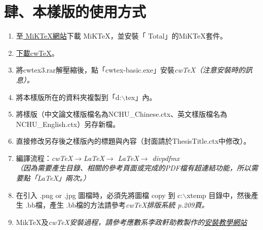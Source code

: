 \chapter{肆、本樣版的使用方式}
\begin{enumerate}
    \item 至\href{http://www.miktex.org/}{ MiKTeX網站}下載 MiK\TeX ，並安裝「 Total」的MiK\TeX 套件。
    \item \href{http://www.amath.nchu.edu.tw/~u4815977/cwtex3.rar}{下載cw\TeX}。
    \item 將cwtex3.rar解壓縮後，點「cwtex-basic.exe」安裝\it{cw}\TeX （注意安裝時的訊息）。
    \item 將本樣版所在的資料夾複製到「d:$\backslash$tex」內。
    \item 將樣版（中文論文樣版檔名為NCHU\_Chinese.ctx、英文樣版檔名為NCHU\_English.ctx）另存新檔。
    \item 直接修改另存後之樣版內的標題與內容（封面請於ThesisTitle.ctx中修改）。
    \item 編譯流程：\it{cw}\TeX $\rightarrow$\LaTeX $\rightarrow$ \LaTeX $\rightarrow$ divpdfmx\\
        （因為需要產生目錄、相關的參考頁面或完成的PDF檔有超連結功能，所以需要點「\LaTeX 」兩次。）
    \item 在引入 .png or .jpg 圖檔時，必須先將圖檔 copy 到 c:$\backslash$xtemp 目錄中，然後產生 .bb檔，產生 .bb檔的方法請參考\it{cw}\TeX 排版系統 p.209頁。
    \item Mik\TeX 及\it{cw}\TeX 安裝過程，請參考應數系李政軒助教製作的\href{http://www.amath.nchu.edu.tw/~u4815977/How_to_Install_cwTeX/How_to_Install_cwTeX.html}{安裝教學網站}
\end{enumerate}
